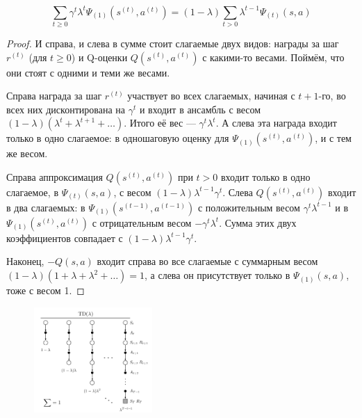 \begin{theoremBox}[label=th:tdlambda]{}\,
\begin{equation}\label{TDlambda}
\sum_{t \ge 0} \gamma^t \lambda^t \Psi_{(1)}(s^{(t)}, a^{(t)}) = (1 - \lambda) \sum_{t > 0} \lambda^{t-1} \Psi_{(t)}(s, a)
\end{equation}
\begin{proof} И справа, и слева в сумме стоит слагаемые двух видов: награды за шаг $r^{(t)}$ (для $t \ge 0$) и Q-оценки $Q(s^{(t)}, a^{(t)})$ с какими-то весами. Поймём, что они стоят с одними и теми же весами.

Справа награда за шаг $r^{(t)}$ участвует во всех слагаемых, начиная с $t + 1$-го, во всех них дисконтирована на $\gamma^t$ и входит в ансамбль с весом $(1 - \lambda)(\lambda^t + \lambda^{t+1} + \dots)$. Итого её вес --- $\gamma^t\lambda^t$. А слева эта награда входит только в одно слагаемое: в одношаговую оценку для $\Psi_{(1)}(s^{(t)}, a^{(t)})$, и с тем же весом.

Справа аппроксимация $Q(s^{(t)}, a^{(t)})$ при $t > 0$ входит только в одно слагаемое, в $\Psi_{(t)}(s, a)$, с весом $(1 - \lambda)\lambda^{t - 1}\gamma^t$. Слева $Q(s^{(t)}, a^{(t)})$ входит в два слагаемых: в $\Psi_{(1)}(s^{(t-1)}, a^{(t-1)})$ с положительным весом $\gamma^t\lambda^{t-1}$ и в $\Psi_{(1)}(s^{(t)}, a^{(t)})$ с отрицательным весом $-\gamma^t\lambda^t$. Сумма этих двух коэффициентов совпадает с $(1 - \lambda)\lambda^{t - 1}\gamma^t$.

Наконец, $-Q(s, a)$ входит справа во все слагаемые с суммарным весом $(1 - \lambda)(1 + \lambda + \lambda^2 + \dots) = 1$, а слева он присутствует только в $\Psi_{(1)}(s, a)$, тоже с весом 1.
\end{proof}
\end{theoremBox}

\begin{figure}
\vspace{-0.3cm}
\centering
\includegraphics[width=0.4\textwidth]{Images/td_lambda.png}
\vspace{-0.7cm}
\end{figure}

